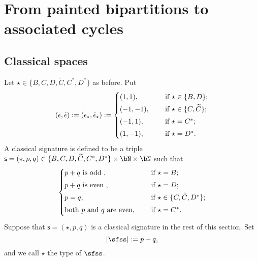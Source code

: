 \documentclass[12pt,a4paper]{amsart}
\def\abs#1{\left|{#1}\right|}
\newcommand{\be}{\begin {equation}}
\newcommand{\ee}{\end {equation}}
\numberwithin{equation}{section}
\theoremstyle{remark}
\begin{document}






\section{From painted bipartitions to associated cycles} \label{sec:bipGeometry}



\subsection{Classical spaces}\label{classical}
Let $\star\in \{B,C,D, \widetilde C, C^*, D^*\}$ as before. Put
\be\label{epsilond}
(\epsilon, \dot \epsilon):=(\epsilon_\star, \dot \epsilon_\star):=\begin{cases}
  (1,1),&\quad \textrm{ if  $\star\in \{B,D\}$;} \smallskip \\
 (-1,-1),&\quad \textrm{ if  $\star\in \{C,\widetilde C\}$;} \smallskip \\
 (-1,1),&\quad \textrm{ if  $\star=C^*$;} \smallskip \\
 (1,-1),&\quad \textrm{ if  $\star=D^*$.}
 \end{cases}
\ee
A classical signature is defined to be a triple  $\mathsf s=(\star, p,q)\in  \{B,C,D, \widetilde C, C^*, D^*\}\times \bN\times \bN$ such that
\[
\begin{cases}
  p+q\textrm{ is odd },&\quad \textrm{ if  $\star=B$;} \smallskip \\
   p+q\textrm{ is even },&\quad \textrm{ if  $\star=D$;} \smallskip \\
 p=q,&\quad \textrm{ if  $\star\in \{C,\widetilde C, D^*\}$;} \smallskip \\
\textrm{both $p$ and $q$ are even} ,&\quad \textrm{ if  $\star=C^*$.} \smallskip \\
 \end{cases}
\]
 Suppose that $\mathsf s=(\star, p,q)$ is a classical  signature in the rest of this section.
Set
\[
  \abs{\sfss}:=p+q,
\]
and we call $\star$ the type of $\sfss$.
\end{document}
